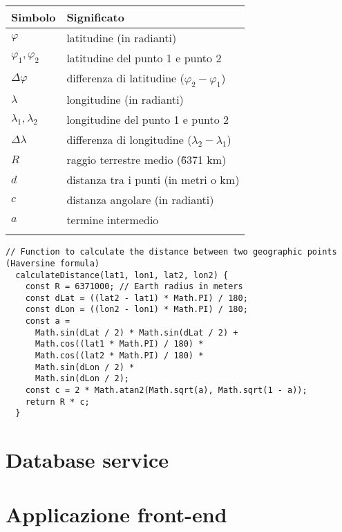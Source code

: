 \begin{tabular}{ll}
  \textbf{Simbolo}       & \textbf{Significato}                                \\
  \hline
  $\varphi$              & latitudine (in radianti)                            \\
  $\varphi_1, \varphi_2$ & latitudine del punto 1 e punto 2                    \\
  $\Delta\varphi$        & differenza di latitudine ($\varphi_2 - \varphi_1$)  \\
  $\lambda$              & longitudine (in radianti)                           \\
  $\lambda_1, \lambda_2$ & longitudine del punto 1 e punto 2                   \\
  $\Delta\lambda$        & differenza di longitudine ($\lambda_2 - \lambda_1$) \\
  $R$                    & raggio terrestre medio (\~ 6371 km)                 \\
  $d$                    & distanza tra i punti (in metri o km)                \\
  $c$                    & distanza angolare (in radianti)                     \\
  $a$                    & termine intermedio                                  \\
  \label{lst:haversine-formula-math-legend}
\end{tabular}

\begin{lstlisting}[caption={Formual di Haversine in codice Javascript}, label=lst:haversine-formula-code]
  // Function to calculate the distance between two geographic points (Haversine formula)
  calculateDistance(lat1, lon1, lat2, lon2) {
    const R = 6371000; // Earth radius in meters
    const dLat = ((lat2 - lat1) * Math.PI) / 180;
    const dLon = ((lon2 - lon1) * Math.PI) / 180;
    const a =
      Math.sin(dLat / 2) * Math.sin(dLat / 2) +
      Math.cos((lat1 * Math.PI) / 180) *
      Math.cos((lat2 * Math.PI) / 180) *
      Math.sin(dLon / 2) *
      Math.sin(dLon / 2);
    const c = 2 * Math.atan2(Math.sqrt(a), Math.sqrt(1 - a));
    return R * c;
  }
\end{lstlisting}

\section{Database service}

\section{Applicazione front-end}